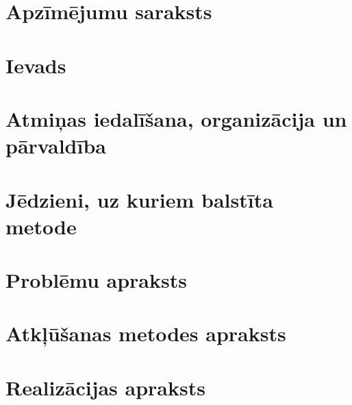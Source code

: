 \documentclass[12pt]{report}
\begin{document}

\setcounter{tocdepth}{1}
\setcounter{secnumdepth}{-1}

\clearpage


\tableofcontents
{}
\setcounter{page}{0}

\setcounter{secnumdepth}{-1}
\chapter{Apzīmējumu saraksts}



\setcounter{secnumdepth}{-1}
\chapter{Ievads}


\setcounter{secnumdepth}{2}
\setcounter{chapter}{0}

\chapter{Atmiņas iedalīšana, organizācija un pārvaldība}\label{chap:chapter_2} %



\chapter{Jēdzieni, uz kuriem balstīta metode}




\chapter{Problēmu apraksts}\label{chap:chapter_3} %


\chapter{Atkļūšanas metodes apraksts}\label{chap:chapter_4} %


\chapter{Realizācijas apraksts}\label{chap:chapter_5}

\end{document}
